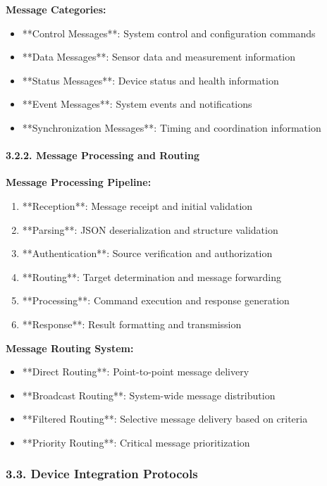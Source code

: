\documentclass[11pt,a4paper]{article}
\begin{document}
\textbf{Message Categories:}

\begin{itemize}
\item **Control Messages**: System control and configuration commands
\item **Data Messages**: Sensor data and measurement information
\item **Status Messages**: Device status and health information
\item **Event Messages**: System events and notifications
\item **Synchronization Messages**: Timing and coordination information

\end{itemize}
\paragraph{3.2.2. Message Processing and Routing}

\textbf{Message Processing Pipeline:}

\begin{enumerate}
\item **Reception**: Message receipt and initial validation
\item **Parsing**: JSON deserialization and structure validation
\item **Authentication**: Source verification and authorization
\item **Routing**: Target determination and message forwarding
\item **Processing**: Command execution and response generation
\item **Response**: Result formatting and transmission

\end{enumerate}
\textbf{Message Routing System:}

\begin{itemize}
\item **Direct Routing**: Point-to-point message delivery
\item **Broadcast Routing**: System-wide message distribution
\item **Filtered Routing**: Selective message delivery based on criteria
\item **Priority Routing**: Critical message prioritization

\end{itemize}
\subsubsection{3.3. Device Integration Protocols}
\end{document}
